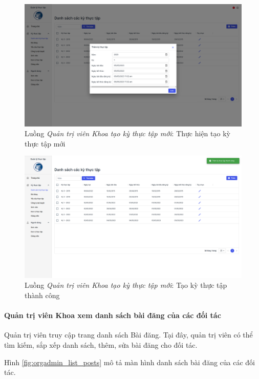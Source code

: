 \documentclass[./../main.tex]{subfiles}
\begin{document}
\begin{figure}[]
	\includegraphics[width=\linewidth]{./images/image54.png}
	\caption{Luồng \emph{Quản trị viên Khoa tạo kỳ thực tập mới}: Thực hiện tạo kỳ thực tập mới}
	\label{fig:org_admin_add_term}
\end{figure}

\begin{figure}[]
	\includegraphics[width=\linewidth]{./images/image55.png}
	\caption{Luồng \emph{Quản trị viên Khoa tạo kỳ thực tập mới}: Tạo kỳ thực tập thành công}
	\label{fig:org_admin_add_term_success}
\end{figure}

\paragraph*{Quản trị viên Khoa xem danh sách bài đăng của các đối tác}

Quản trị viên truy cập trang danh sách Bài đăng. Tại đây, quản trị viên có thể tìm kiếm, sắp xếp danh sách, thêm, sửa bài đăng cho đối tác.

Hình \ref{fig:orgadmin_list_posts} mô tả màn hình danh sách bài đăng của các đối tác.
\end{document}
